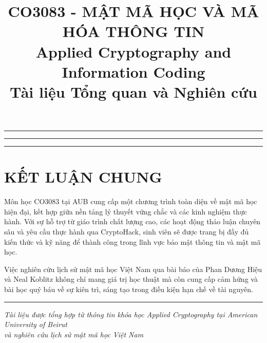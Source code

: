 \documentclass[12pt,a4paper]{article}
\title{\textbf{CO3083 - MẬT MÃ HỌC VÀ MÃ HÓA THÔNG TIN} \\ 
       \Large Applied Cryptography and Information Coding \\
       \normalsize Tài liệu Tổng quan và Nghiên cứu}
\author{}
\date{}
\begin{document}
\maketitle
\thispagestyle{empty}
\newpage

\tableofcontents
\newpage

\vspace{1cm}
\rule{\textwidth}{1pt}
\vspace{0.5cm}



\newpage



\vspace{0.5cm}
\rule{\textwidth}{1pt}
\vspace{0.5cm}



\newpage



\vspace{1cm}
\rule{\textwidth}{1pt}
\vspace{0.5cm}

\section{KẾT LUẬN CHUNG}

Môn học CO3083 tại AUB cung cấp một chương trình toàn diện về mật mã học hiện đại, kết hợp giữa nền tảng lý thuyết vững chắc và các kinh nghiệm thực hành. Với sự hỗ trợ từ giáo trình chất lượng cao, các hoạt động thảo luận chuyên sâu và yêu cầu thực hành qua CryptoHack, sinh viên sẽ được trang bị đầy đủ kiến thức và kỹ năng để thành công trong lĩnh vực bảo mật thông tin và mật mã học.

Việc nghiên cứu lịch sử mật mã học Việt Nam qua bài báo của Phan Dương Hiệu và Neal Koblitz không chỉ mang giá trị học thuật mà còn cung cấp cảm hứng và bài học quý báu về sự kiên trì, sáng tạo trong điều kiện hạn chế về tài nguyên.

\vspace{1cm}
\rule{\textwidth}{1pt}
\vspace{0.5cm}

\begin{center}
\textit{Tài liệu được tổng hợp từ thông tin khóa học Applied Cryptography tại American University of Beirut \\
và nghiên cứu lịch sử mật mã học Việt Nam}
\end{center}
\end{document}
